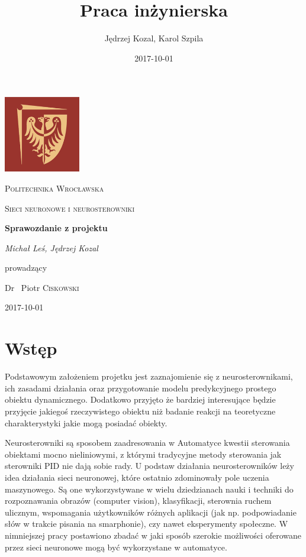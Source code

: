 \documentclass{article}
\title{Praca inżynierska}
\date{2017-10-01}
\author{Jędrzej Kozal, Karol Szpila}
\begin{document}
\begin{titlepage}
	\centering
	\includegraphics[width=0.25\textwidth]{logo_pol_wroclaw.png}\par\vspace{1cm}
	{\scshape\LARGE Politechnika Wrocławska \par}
	\vspace{1cm}
	{\scshape\Large Sieci neuronowe i neurosterowniki \par}
	\vspace{1.5cm}
	{\huge\bfseries Sprawozdanie z projektu \par}
	\vspace{2cm}
	{\Large\itshape Michał Leś, Jędrzej Kozal\par}
	\vfill
	prowadzący\par
	Dr ~Piotr \textsc{Ciskowski}

	\vfill

	{\large 2017-10-01\par}
\end{titlepage}

\section{Wstęp}
Podstawowym założeniem projetku jest zaznajomienie się z neurosterownikami, ich zasadami działania oraz przygotowanie modelu predykcyjnego prostego obiektu dynamicznego. Dodatkowo przyjęto że bardziej interesujące będzie przyjęcie jakiegoś rzeczywistego obiektu niż badanie reakcji na teoretyczne charakterystyki jakie mogą posiadać obiekty.

Neurosterowniki są sposobem zaadresowania w Automatyce kwestii sterowania obiektami mocno nieliniowymi, z którymi tradycyjne metody sterowania jak sterowniki PID nie dają sobie rady. U podstaw działania neurosterowników leży idea działania sieci neuronowej, które ostatnio zdominowały pole uczenia maszynowego. Są one wykorzystywane w wielu dziedzianach nauki i techniki do rozpoznawania obrazów (computer vision), klasyfikacji, sterownia ruchem ulicznym, wspomagania użytkowników różnych aplikacji (jak np. podpowiadanie słów w trakcie pisania na smarphonie), czy nawet eksperymenty społeczne. W nimniejszej pracy postawiono zbadać w jaki sposób szerokie możliwości oferowane przez sieci neuronowe mogą być wykorzystane w automatyce.
\end{document}
